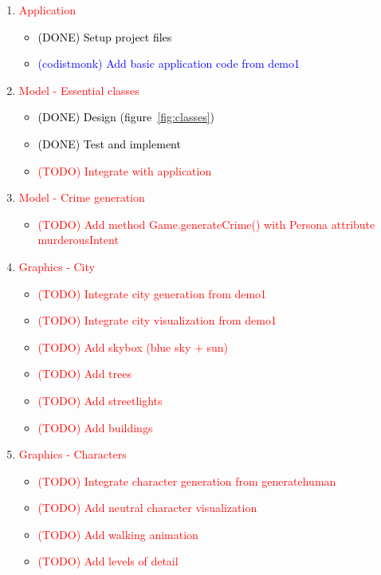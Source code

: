 \documentclass[a4paper, twoside]{article}
\begin{document}
\begin{enumerate}
	\item{} \textcolor{red}{Application} \begin{itemize}
		\item{} \textcolor{black}{(DONE) Setup project files}
		\item{} \textcolor{blue}{(codistmonk) Add basic application code from demo1}
	\end{itemize}
	\item{} \textcolor{red}{Model - Essential classes} \begin{itemize}
		\item{} \textcolor{black}{(DONE) Design (figure~\ref{fig:classes})}
		\item{} \textcolor{black}{(DONE) Test and implement}
		\item{} \textcolor{red}{(TODO) Integrate with application}
	\end{itemize}
	\item{} \textcolor{red}{Model - Crime generation} \begin{itemize}
		\item{} \textcolor{red}{(TODO) Add method Game.generateCrime() with Persona attribute murderousIntent}
	\end{itemize}
	\item{} \textcolor{red}{Graphics - City} \begin{itemize}
		\item{} \textcolor{red}{(TODO) Integrate city generation from demo1}
		\item{} \textcolor{red}{(TODO) Integrate city visualization from demo1}
		\item{} \textcolor{red}{(TODO) Add skybox (blue sky + sun)}
		\item{} \textcolor{red}{(TODO) Add trees}
		\item{} \textcolor{red}{(TODO) Add streetlights}
		\item{} \textcolor{red}{(TODO) Add buildings}
	\end{itemize}
	\item{} \textcolor{red}{Graphics - Characters} \begin{itemize}
		\item{} \textcolor{red}{(TODO) Integrate character generation from generatehuman}
		\item{} \textcolor{red}{(TODO) Add neutral character visualization}
		\item{} \textcolor{red}{(TODO) Add walking animation}
		\item{} \textcolor{red}{(TODO) Add levels of detail}

\end{itemize}
\end{enumerate}
\end{document}
